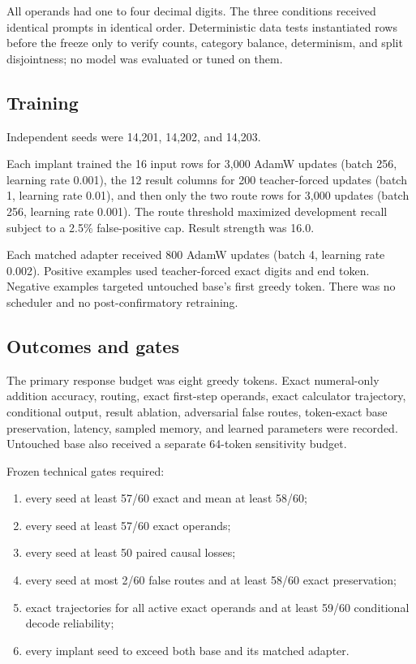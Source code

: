 \documentclass[11pt]{article}
\begin{document}
All operands had one to four decimal digits. The three conditions received
identical prompts in identical order. Deterministic data tests instantiated
rows before the freeze only to verify counts, category balance, determinism,
and split disjointness; no model was evaluated or tuned on them.

\subsection{Training}

Independent seeds were 14,201, 14,202, and 14,203.

Each implant trained the 16 input rows for 3,000 AdamW updates (batch 256,
learning rate 0.001), the 12 result columns for 200 teacher-forced updates
(batch 1, learning rate 0.01), and then only the two route rows for 3,000
updates (batch 256, learning rate 0.001). The route threshold maximized
development recall subject to a 2.5\% false-positive cap. Result strength was
16.0.

Each matched adapter received 800 AdamW updates (batch 4, learning rate
0.002). Positive examples used teacher-forced exact digits and end token.
Negative examples targeted untouched base's first greedy token. There was no
scheduler and no post-confirmatory retraining.

\subsection{Outcomes and gates}

The primary response budget was eight greedy tokens. Exact numeral-only
addition accuracy, routing, exact first-step operands, exact calculator
trajectory, conditional output, result ablation, adversarial false routes,
token-exact base preservation, latency, sampled memory, and learned parameters
were recorded. Untouched base also received a separate 64-token sensitivity
budget.

Frozen technical gates required:

\begin{enumerate}
\item every seed at least 57/60 exact and mean at least 58/60;
\item every seed at least 57/60 exact operands;
\item every seed at least 50 paired causal losses;
\item every seed at most 2/60 false routes and at least 58/60 exact
      preservation;
\item exact trajectories for all active exact operands and at least 59/60
      conditional decode reliability;
\item every implant seed to exceed both base and its matched adapter.
\end{enumerate}
\end{document}
